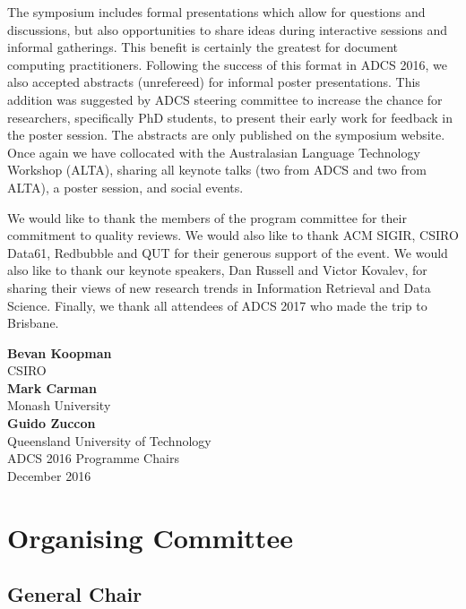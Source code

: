 \documentclass[a4paper]{article}
\begin{document}
The symposium includes formal presentations which allow for questions and
discussions, but also opportunities to share ideas during interactive sessions
and informal gatherings. This benefit is certainly the greatest for document
computing practitioners. Following the success of this format in ADCS 2016, we also accepted abstracts (unrefereed) for informal poster presentations. This addition was suggested by ADCS steering committee to increase the chance for researchers, specifically PhD students, to present their early work for feedback in the poster session. The abstracts are only published on the symposium website. Once again we have collocated with the Australasian
Language Technology Workshop (ALTA), sharing all keynote talks (two from ADCS and two from ALTA), a poster session, and social events.

We would like to thank the members of the program committee for their
commitment to quality reviews. We would also like to thank ACM SIGIR, CSIRO Data61, Redbubble and QUT 
 for their generous support of the event. We would
also like to thank our keynote speakers, Dan Russell and Victor Kovalev, for sharing their views of new
research trends in Information Retrieval and Data Science. Finally, we thank all attendees of
ADCS 2017 who made the trip to Brisbane.

\vspace{1cm}

\begin{flushright}\noindent
\textbf{Bevan Koopman}\\
CSIRO \\[.1in]
\textbf{Mark Carman}\\
Monash University\\[.1in]
\textbf{Guido Zuccon}\\
Queensland University of Technology \\[.1in]
ADCS 2016 Programme Chairs\\
December 2016
\end{flushright}

\newpage


\section*{Organising Committee}


\subsection*{General Chair}
\end{document}
